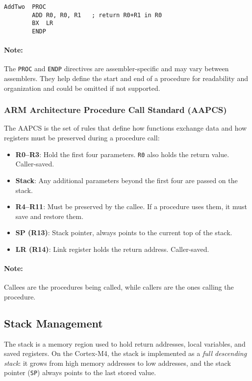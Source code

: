 \begin{lstlisting}[caption={Basic procedure structure}]
AddTwo  PROC
        ADD R0, R0, R1   ; return R0+R1 in R0
        BX  LR
        ENDP
\end{lstlisting}
\paragraph{Note:} The \texttt{PROC} and \texttt{ENDP} directives are assembler-specific and may vary between assemblers. They help define the start and end of a procedure for readability and organization and could be omitted if not supported.

\subsubsection{ARM Architecture Procedure Call Standard (AAPCS)}

The AAPCS is the set of rules that define how functions exchange data and how registers must be preserved during a procedure call:

\begin{itemize}[nosep]
  \item \textbf{R0--R3}: Hold the first four parameters. \texttt{R0} also holds the return value. Caller-saved.
  \item \textbf{Stack}: Any additional parameters beyond the first four are passed on the stack.
  \item \textbf{R4--R11}: Must be preserved by the callee. If a procedure uses them, it must save and restore them. 
  \item \textbf{SP (R13)}: Stack pointer, always points to the current top of the stack.
  \item \textbf{LR (R14)}: Link register holds the return address. Caller-saved.
\end{itemize}
\paragraph{Note:} Callees are the procedures being called, while callers are the ones calling the procedure.

\subsection{Stack Management}

The stack is a memory region used to hold return addresses, local variables, and saved registers.  
On the Cortex-M4, the stack is implemented as a \emph{full descending stack}: it grows from high memory addresses to low addresses, and the stack pointer (\texttt{SP}) always points to the last stored value.

